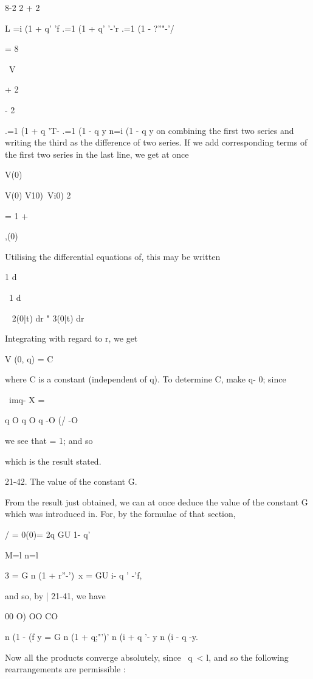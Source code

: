 8-2 2 + 2

L =i (1 + q' 'f .=1 (1 + q' '-'r .=1 (1 - ?''"-'/

= 8

\ V

+ 2

- 2

.=1 (1 + q 'T- .=1 (1 - q y n=i (1 - q y on combining the first two
series and writing the third as the difference of two series. If we
add corresponding terms of the first two series in the last line, we
get at once

V(0)

 V(0) V10)\ Vi0) 2

= 1 +

,(0) %

%
%

Utilising the differential equations of, this may be written

1 d%

\ 1 d%

~ 2(0|t) dr " 3(0|t) dr %

Integrating with regard to r, we get

V (0, q) = C%

where C is a constant (independent of q). To determine C, make q- 0;
since

\ imq- X = %

q O q O q -O (/ -O

we see that = 1; and so

which is the result stated.

21-42. The value of the constant G.

From the result just obtained, we can at once deduce the value of the
constant G which was introduced in. For, by the formulae of
that section,

 / = 0(0)= 2q GU 1- q' %

M=l n=l

 3 = G n (1 + r''-')\ x = GU i- q ' -'f,

and so, by | 21-41, we have

00 O) OO CO

n (1 - (f y = G n (1 + q;"')' n (i + q '- y n (i - q -y.

Now all the products converge absolutely, since \ q\ < l, and so the
following rearrangements are permissible :

